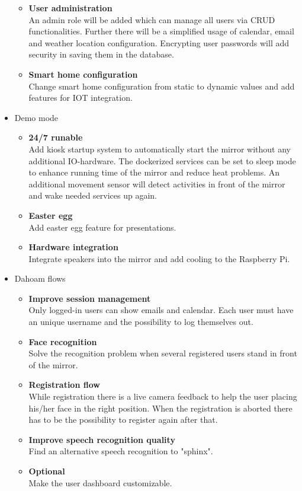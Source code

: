 \documentclass[12pt]{article}
\theoremstyle{definition}
\begin{document}
\begin{itemize}
\begin{itemize}
        \item \textbf{User administration} \\
        An admin role will be added which can manage all users via CRUD functionalities. Further there will be a simplified usage of calendar, email and weather location configuration. Encrypting user passwords will add security in saving them in the database.
        \item \textbf{Smart home configuration} \\
        Change smart home configuration from static to dynamic values and add features for IOT integration.
    \end{itemize}
    \item Demo mode 
    \begin{itemize}  \\
    \item \textbf{24/7 runable}\\
        Add kiosk startup system to automatically start the mirror without any additional IO-hardware. The dockerized services can be set to sleep mode to enhance running time of the mirror and reduce heat problems. An additional movement sensor will detect activities in front of the mirror and wake needed services up again.
    \item \textbf{Easter egg}\\
        Add easter egg feature for presentations.
    \item \textbf{Hardware integration}\\
        Integrate speakers into the mirror and add cooling to the Raspberry Pi. \\
    \end{itemize}
    \item Dahoam flows
    \begin{itemize} \\
        \item \textbf{Improve session management}\\
        Only logged-in users can show emails and calendar. Each user must have an unique username and the possibility to log themselves out.
        \item \textbf{Face recognition}\\
        Solve the recognition problem when several registered users stand in front of the mirror.
        \item \textbf{Registration flow}\\
        While registration there is a live camera feedback to help the user placing his/her face in the right position. When the registration is aborted there has to be the possibility to register again after that.
        \item \textbf{Improve speech recognition quality}\\
        Find an alternative speech recognition to "sphinx".
        \item \textbf{Optional}\\
        Make the user dashboard customizable.
    \end{itemize}
\end{itemize}
\end{document}
